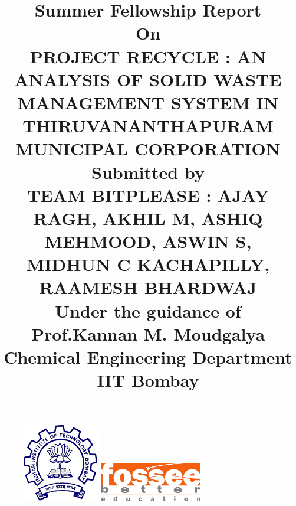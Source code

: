 \documentclass[12pt,a4paper]{  report}
\begin{document}
\begin{figure}
	\centering
	\includegraphics[width = 0.3\textwidth]{iit}
	\hspace{1cm}
	\includegraphics[width = 0.4\textwidth]{fossee-logo}
\end{figure}

\title
	{\textbf
			{\textbf
				{Summer Fellowship Report}}
				\vspace{5mm} 
				\\\small On 
				\\\vspace{5mm} 
				\textbf
				{\large PROJECT RECYCLE : AN ANALYSIS OF SOLID WASTE MANAGEMENT SYSTEM IN THIRUVANANTHAPURAM MUNICIPAL CORPORATION}
				\vspace{5mm} 
				\\\vspace{5mm}
				\small Submitted by
				\\\vspace{5mm}  
				\large 
				\textbf
					{TEAM BITPLEASE :}
					\small AJAY RAGH, AKHIL M, ASHIQ MEHMOOD, ASWIN S, MIDHUN C KACHAPILLY, RAAMESH BHARDWAJ	
					\\ \vspace{5mm}
				\small Under the guidance of \\ \vspace{5mm}
				\large 
				\textbf{Prof.Kannan M. Moudgalya} 
				\vspace{1mm}\\ Chemical Engineering Department  \vspace{1mm} \\IIT Bombay
}
\vspace{1cm}


\maketitle
\end{document}

